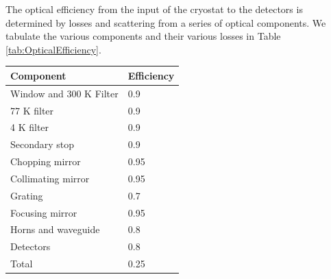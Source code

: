 The optical efficiency from the input of the cryostat to the detectors is determined by losses and scattering from a series of optical components.  We tabulate the various components and their various losses in Table \ref{tab:OpticalEfficiency}.

\begin{center}
\begin{tabular}{ll}
Component & Efficiency \\
\hline
Window and 300 K Filter & 0.9 \\
77 K filter & 0.9 \\
4 K filter  & 0.9 \\
Secondary stop & 0.9 \\
Chopping mirror & 0.95 \\
Collimating mirror & 0.95 \\
Grating & 0.7 \\
Focusing mirror & 0.95 \\
Horns and waveguide & 0.8 \\
Detectors & 0.8 \\
\hline
Total & 0.25 
\end{tabular}
\end{center}




